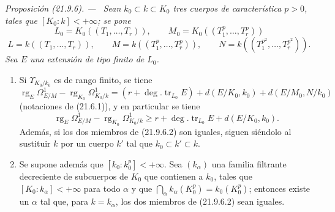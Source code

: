 \documentclass[10pt,oneside]{book}
\makeatletter
\newcommand{\setmanualcurrentlabel}[1]{\def\@currentlabel{#1}}
\newenvironment{proposition}[1][]{%
  \setmanualcurrentlabel{#1}\par\medskip\noindent\itshape Proposición (#1). ---\ }{\par}
\providecommand{\setmin}{-}%
\makeatother
\begin{document}
\begin{proposition}[21.9.6]
\label{0.21.9.6-es}
Sean $k_0\subset k\subset K_0$ tres cuerpos de característica $p>0$, tales
que $[K_0:k]<+\infty$; se pone
\[
  L_0=K_0((T_1,\ldots,T_r)),\qquad
  M_0=K_0((T_1^p,\ldots,T_r^p))
\]
\[
  L=k((T_1,\ldots,T_r)),\qquad
  M=k((T_1^p,\ldots,T_r^p)),\qquad
  N=k((T_1^{p^2},\ldots,T_r^{p^2})).
\]
Sea $E$ una extensión de tipo finito de $L_0$.
\begin{enumerate}
  \item[\textup{(i)}] Si $\Upsilon_{K_0/k_0}$ es de rango finito, se tiene
  \begin{equation}
  \tag{21.9.6.1}
  \label{0.21.9.6.1-es}
    \operatorname{rg}_E\Omega^1_{E/M}
    \setmin\operatorname{rg}_{K_0}\Omega^1_{K_0/k}
    =(r+\deg.\operatorname{tr}_{L_0}E)
      +d(E/K_0,k_0)+d(E/M_0,N/k_0)
  \end{equation}
  (notaciones de (21.6.1)), y en particular se tiene
  \begin{equation}
  \tag{21.9.6.2}
  \label{0.21.9.6.2-es}
    \operatorname{rg}_E\Omega^1_{E/M}
    \setmin\operatorname{rg}_{K_0}\Omega^1_{K_0/k}
    \geqslant r+\deg.\operatorname{tr}_{L_0}E+d(E/K_0,k_0).
  \end{equation}
  Además, si los dos miembros de (21.9.6.2) son iguales, siguen siéndolo al
  sustituir $k$ por un cuerpo $k'$ tal que $k_0\subset k'\subset k$.

  \item[\textup{(ii)}] Se supone además que $[k_0:k_0^p]<+\infty$. Sea
  $(k_\alpha)$ una familia filtrante decreciente de subcuerpos de $K_0$ que
  contienen a $k_0$, tales que $[K_0:k_\alpha]<+\infty$ para todo $\alpha$ y
  que $\bigcap_\alpha k_\alpha(K_0^p)=k_0(K_0^p)$; entonces existe un
  $\alpha$ tal que, para $k=k_\alpha$, los dos miembros de (21.9.6.2) sean
  iguales.
\end{enumerate}
\end{proposition}
\end{document}
